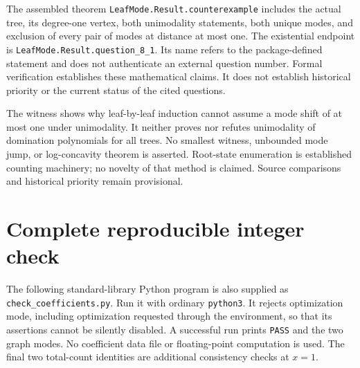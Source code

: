 \documentclass[11pt]{article}
\begin{document}
The assembled theorem \texttt{LeafMode.Result.counterexample} includes the actual tree, its degree-one vertex, both unimodality statements, both unique modes, and exclusion of every pair of modes at distance at most one. The existential endpoint is \texttt{LeafMode.Result.question\_8\_1}. Its name refers to the package-defined statement and does not authenticate an external question number. Formal verification establishes these mathematical claims. It does not establish historical priority or the current status of the cited questions.

The witness shows why leaf-by-leaf induction cannot assume a mode shift of at most one under unimodality. It neither proves nor refutes unimodality of domination polynomials for all trees. No smallest witness, unbounded mode jump, or log-concavity theorem is asserted. Root-state enumeration is established counting machinery; no novelty of that method is claimed. Source comparisons and historical priority remain provisional.




\clearpage
\appendix
\section{Complete reproducible integer check}\label{app:code}
The following standard-library Python program is also supplied as \texttt{check\_coefficients.py}. Run it with ordinary \texttt{python3}. It rejects optimization mode, including optimization requested through the environment, so that its assertions cannot be silently disabled. A successful run prints \texttt{PASS} and the two graph modes. No coefficient data file or floating-point computation is used. The final two total-count identities are additional consistency checks at $x=1$.

\end{document}
